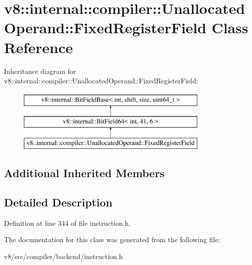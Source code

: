 \hypertarget{classv8_1_1internal_1_1compiler_1_1UnallocatedOperand_1_1FixedRegisterField}{}\section{v8\+:\+:internal\+:\+:compiler\+:\+:Unallocated\+Operand\+:\+:Fixed\+Register\+Field Class Reference}
\label{classv8_1_1internal_1_1compiler_1_1UnallocatedOperand_1_1FixedRegisterField}
Inheritance diagram for v8\+:\+:internal\+:\+:compiler\+:\+:Unallocated\+Operand\+:\+:Fixed\+Register\+Field\+:\begin{figure}[H]
\begin{center}
\leavevmode
\includegraphics[height=3.000000cm]{classv8_1_1internal_1_1compiler_1_1UnallocatedOperand_1_1FixedRegisterField}
\end{center}
\end{figure}
\subsection*{Additional Inherited Members}


\subsection{Detailed Description}


Definition at line 344 of file instruction.\+h.



The documentation for this class was generated from the following file\+:\begin{DoxyCompactItemize}
\item 
v8/src/compiler/backend/instruction.\+h\end{DoxyCompactItemize}
